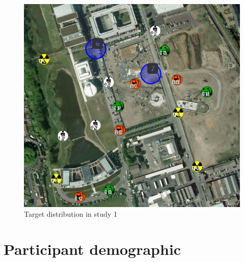 \begin{figure}[H]
  \centering
  \includegraphics[width=1\textwidth]{img/Appendix/targets1}
  \caption{Target distribution in study 1}
\end{figure}


\section{Participant demographic}\label{app:demo1}

